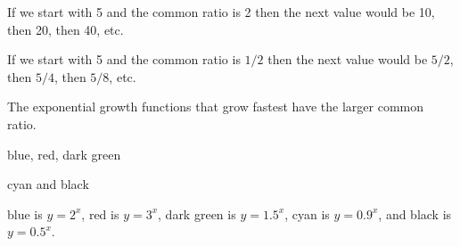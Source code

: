 \begin{bighint}
   \ba
        \item If we start with 5 and the common ratio is 2 then the next value would be
            10, then 20, then 40, etc.
        \item If we start with 5 and the common ratio is $1/2$ then the next value would
            be $5/2$, then $5/4$, then $5/8$, etc.
        \item The exponential growth functions that grow fastest have the larger common
            ratio.
   \ea
\end{bighint}
\begin{activitySolution}
   \ba
        \item blue, red, dark green
        \item cyan and black
        \item blue is $y = 2^x$, red is $y = 3^x$, dark green is $y=1.5^x$, cyan is
            $y=0.9^x$, and black is $y=0.5^x$.
   \ea
\end{activitySolution}

\aftera
